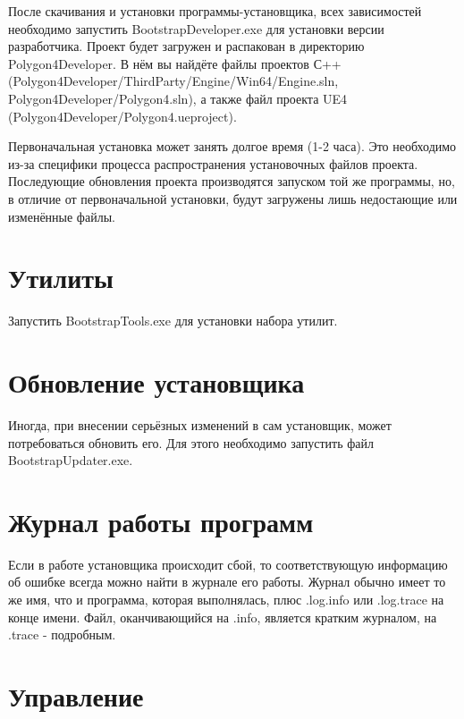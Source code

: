 \documentclass[a4paper,12pt]{report}
\newcommand{\ue}{UE4\xspace}
\begin{document}
После скачивания и установки программы-установщика, всех зависимостей необходимо запустить BootstrapDeveloper.exe для установки версии разработчика.
Проект будет загружен и распакован в директорию \\Polygon4Developer.
В нём вы найдёте файлы проектов С++ \\(Polygon4Developer/ThirdParty/Engine/Win64/Engine.sln,\\ Polygon4Developer/Polygon4.sln), а также файл проекта \ue\\ (Polygon4Developer/Polygon4.ueproject).

Первоначальная установка может занять долгое время (1-2 часа).
Это необходимо из-за специфики процесса распространения установочных файлов проекта.
Последующие обновления проекта производятся запуском той же программы, но, в отличие от первоначальной установки, будут загружены лишь недостающие или изменённые файлы.


\section{Утилиты}

Запустить BootstrapTools.exe для установки набора утилит.


\section{Обновление установщика}

Иногда, при внесении серьёзных изменений в сам установщик, может потребоваться обновить его.
Для этого необходимо запустить файл BootstrapUpdater.exe.

\section{Журнал работы программ}

Если в работе установщика происходит сбой, то соответствующую информацию об ошибке всегда можно найти в журнале его работы.
Журнал обычно имеет то же имя, что и программа, которая выполнялась, плюс .log.info или .log.trace на конце имени.
Файл, оканчивающийся на .info, является кратким журналом, на .trace - подробным.

\section{Управление}
\end{document}
